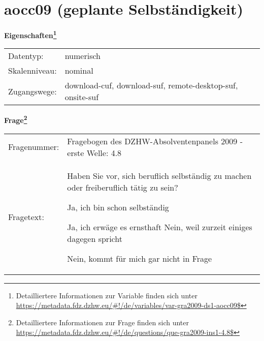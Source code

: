 
    \setcounter{footnote}{0}

    \vspace*{-1.8cm}
	\section{aocc09 (geplante Selbständigkeit)}
	\label{section:aocc09}



    \vspace*{0.5cm}
    \noindent\textbf{Eigenschaften\footnote{Detailliertere Informationen zur Variable finden sich unter
		\url{https://metadata.fdz.dzhw.eu/\#!/de/variables/var-gra2009-ds1-aocc09$}}}\\
	\begin{tabularx}{\hsize}{@{}lX}
	Datentyp: & numerisch \\
	Skalenniveau: & nominal \\
	Zugangswege: &
	  download-cuf, 
	  download-suf, 
	  remote-desktop-suf, 
	  onsite-suf
 \\
    \end{tabularx}



				\vspace*{0.5cm}
                \noindent\textbf{Frage\footnote{Detailliertere Informationen zur Frage finden sich unter
		              \url{https://metadata.fdz.dzhw.eu/\#!/de/questions/que-gra2009-ins1-4.8$}}}\\
				\begin{tabularx}{\hsize}{@{}lX}
					Fragenummer: &
					  Fragebogen des DZHW-Absolventenpanels 2009 - erste Welle:
					  4.8
 \\
					Fragetext: & Haben Sie vor, sich beruflich selbständig zu machen oder freiberuflich tätig zu sein?\par  Ja, ich bin schon selbständig\par  Ja, ich erwäge es ernsthaft Nein, weil zurzeit einiges dagegen spricht\par  Nein, kommt für mich gar nicht in Frage \\
				\end{tabularx}





